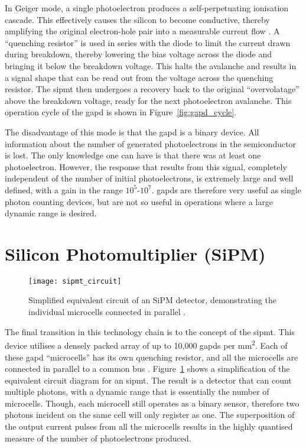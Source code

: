 In Geiger mode, a single photoelectron produces a self-perpetuating ionisation cascade. This effectively causes the silicon to become conductive, thereby amplifying the original electron-hole pair into a measurable current flow \cite{SensL2011}. A ``quenching resistor'' is used in series with the diode to limit the current drawn during breakdown, thereby lowering the bias voltage across the diode and bringing it below the breakdown voltage. This halts the avalanche and results in a signal shape that can be read out from the voltage across the quenching resistor. The \gls{sipmt} then undergoes a recovery back to the original ``overvolatage'' above the breakdown voltage, ready for the next photoelectron avalanche. This operation cycle of the \gls{gapd} is shown in Figure~\ref{fig:gapd_cycle}.

The disadvantage of this mode is that the \gls{gapd} is a binary device. All information about the number of generated photoelectrons in the semiconductor is lost. The only knowledge one can have is that there was at least one photoelectron. However, the response that results from this signal, completely independent of the number of initial photoelectrons, is extremely large and well defined, with a gain in the range $10^5$-$10^7$. \glspl{gapd} are therefore very useful as single photon counting devices, but are not so useful in operations where a large dynamic range is desired. 

\section{Silicon Photomultiplier (SiPM)}

\begin{figure}
	\centering
    \texttt{[image: sipmt\_circuit]} 
	\caption[Simplified equivalent circuit of an SiPM detector.]{Simplified equivalent circuit of an SiPM detector, demonstrating the individual microcells connected in parallel \cite{Marano2014}.}
	\label{fig:sipmt_circuit}
\end{figure}

The final transition in this technology chain is to the concept of the \gls{sipmt}. This device utilises a densely packed array of up to 10,000 \glspl{gapd} per \si{mm\squared}. Each of these \gls{gapd} ``microcells'' has its own quenching resistor, and all the microcells are connected in parallel to a common bus \cite{Otte2006}. Figure~\ref{fig:sipmt_circuit} shows a simplification of the equivalent circuit diagram for an \gls{sipmt}. The result is a detector that can count multiple photons, with a dynamic range that is essentially the number of microcells. Though, each microcell still operates as a binary sensor, therefore two photons incident on the same cell will only register as one. The superposition of the output current pulses from all the microcells results in the highly quantised measure of the number of photoelectrons produced.